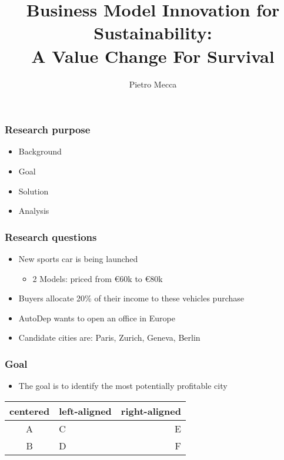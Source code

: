 \documentclass{beamer}
\title{Business Model Innovation for Sustainability: \\ A Value Change For Survival}
\author{Pietro Mecca}
\begin{document}
\maketitle

\begin{frame}
  \frametitle{Research purpose} %

  \begin{itemize}
    \item Background
    \item Goal
    \item Solution
    \item Analysis
  \end{itemize}
\end{frame}

\begin{frame}
  \frametitle{Research questions}  %

  \begin{itemize}
    \item New sports car is being launched
    \begin{itemize}
     \item 2 Models: priced from €60k to €80k
    \end{itemize}
    \item Buyers allocate 20\% of their income to these vehicles purchase
    \item AutoDep wants to open an office in Europe
    \item Candidate cities are: Paris, Zurich, Geneva, Berlin
  \end{itemize}
\end{frame}

\begin{frame}
  \frametitle{Goal} %

  \begin{itemize}
    \item The goal is to identify the most potentially profitable city
  \end{itemize}
\end{frame}

\begin{frame}
 \begin{tabular}{|c||l||r|}
 \hline
     centered & left-aligned & right-aligned \\ 
 \hline
     A & C & E\\ 
 \hline
     B & D & F\\ 
 \hline
 \end{tabular}
\end{frame}
\end{document}
